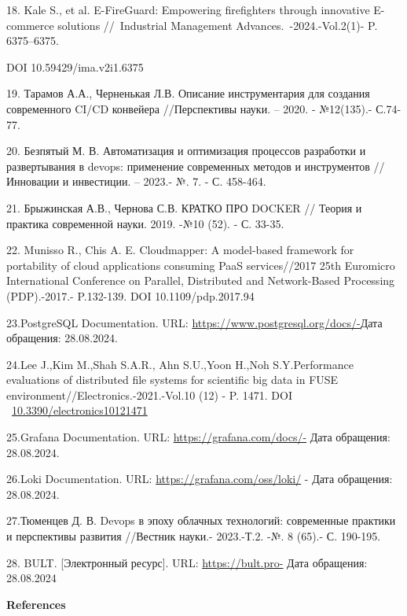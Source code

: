 \begin{references}
18. Kale S., et al. E-FireGuard: Empowering firefighters through
innovative E-commerce solutions //~Industrial Management
Advances.~-2024.-Vol.2(1)- P. 6375--6375.

DOI 10.59429/ima.v2i1.6375

19. Тарамов А.А., Черненькая Л.В. Описание инструментария для создания
современного CI/CD конвейера //Перспективы науки. -- 2020. - №12(135).-
С.74-77.

20. Безпятый М. В. Автоматизация и оптимизация процессов разработки и
развертывания в devops: применение современных методов и инструментов
//Инновации и инвестиции. -- 2023.- №. 7. - С. 458-464.

21. Брыжинская А.В., Чернова С.В. КРАТКО ПРО DOCKER // Теория и практика
современной науки. 2019. -№10 (52). - С. 33-35.

22. Munisso R., Chis A. E. Cloudmapper: A model-based framework for
portability of cloud applications consuming PaaS services//2017 25th
Euromicro International Conference on Parallel, Distributed and
Network-Based Processing (PDP).-2017.- P.132-139. DOI
10.1109/pdp.2017.94

23.PostgreSQL Documentation. URL:
\url{https://www.postgresql.org/docs/-}Дата обращения: 28.08.2024.

24.Lee J.,Kim M.,Shah S.A.R., Ahn S.U.,Yoon H.,Noh S.Y.Performance
evaluations of distributed file systems for scientific big data in FUSE
environment//Electronics.-2021.-Vol.10 (12) - P. 1471. DOI
~\href{https://doi.org/10.3390/electronics10121471}{10.3390/electronics10121471}

25.Grafana Documentation. URL: \url{https://grafana.com/docs/-} Дата
обращения: 28.08.2024.

26.Loki Documentation. URL: \url{https://grafana.com/oss/loki/} - Дата
обращения: 28.08.2024.

27.Тюменцев Д. В. Devops в эпоху облачных технологий: современные
практики и перспективы развития //Вестник науки.- 2023.-Т.2. -№. 8
(65).- С. 190-195.

28. BULT. {[}Электронный ресурс{]}. URL: \url{https://bult.pro-} Дата
обращения: 28.08.2024
\end{references}

\begin{center}
{\bfseries References}
\end{center}

